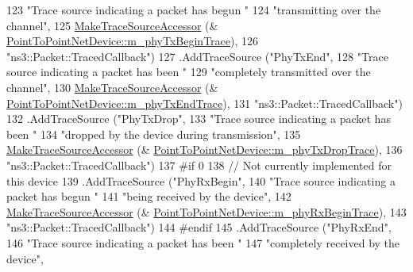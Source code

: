\begin{DoxyCode}
123                      \textcolor{stringliteral}{"Trace source indicating a packet has begun "}
124                      \textcolor{stringliteral}{"transmitting over the channel"},
125                      \hyperlink{group__tracing_gab21a770b9855af4e8f69f7531ea4a6b0}{MakeTraceSourceAccessor} (&
      \hyperlink{classns3_1_1PointToPointNetDevice_aa75567144b7715713970bb575ebd26cf}{PointToPointNetDevice::m\_phyTxBeginTrace}),
126                      \textcolor{stringliteral}{"ns3::Packet::TracedCallback"})
127     .AddTraceSource (\textcolor{stringliteral}{"PhyTxEnd"}, 
128                      \textcolor{stringliteral}{"Trace source indicating a packet has been "}
129                      \textcolor{stringliteral}{"completely transmitted over the channel"},
130                      \hyperlink{group__tracing_gab21a770b9855af4e8f69f7531ea4a6b0}{MakeTraceSourceAccessor} (&
      \hyperlink{classns3_1_1PointToPointNetDevice_ad24afff2bade80cd2e2b952117f3945a}{PointToPointNetDevice::m\_phyTxEndTrace}),
131                      \textcolor{stringliteral}{"ns3::Packet::TracedCallback"})
132     .AddTraceSource (\textcolor{stringliteral}{"PhyTxDrop"}, 
133                      \textcolor{stringliteral}{"Trace source indicating a packet has been "}
134                      \textcolor{stringliteral}{"dropped by the device during transmission"},
135                      \hyperlink{group__tracing_gab21a770b9855af4e8f69f7531ea4a6b0}{MakeTraceSourceAccessor} (&
      \hyperlink{classns3_1_1PointToPointNetDevice_a66a13667106d35d2cbf70c166617c660}{PointToPointNetDevice::m\_phyTxDropTrace}),
136                      \textcolor{stringliteral}{"ns3::Packet::TracedCallback"})
137 \textcolor{preprocessor}{#if 0}
138     \textcolor{comment}{// Not currently implemented for this device}
139     .AddTraceSource (\textcolor{stringliteral}{"PhyRxBegin"}, 
140                      \textcolor{stringliteral}{"Trace source indicating a packet has begun "}
141                      \textcolor{stringliteral}{"being received by the device"},
142                      \hyperlink{group__tracing_gab21a770b9855af4e8f69f7531ea4a6b0}{MakeTraceSourceAccessor} (&
      \hyperlink{classns3_1_1PointToPointNetDevice_aca46a6ee3f8778f9cf13ddd55efc59fa}{PointToPointNetDevice::m\_phyRxBeginTrace}),
143                      \textcolor{stringliteral}{"ns3::Packet::TracedCallback"})
144 \textcolor{preprocessor}{#endif}
145     .AddTraceSource (\textcolor{stringliteral}{"PhyRxEnd"}, 
146                      \textcolor{stringliteral}{"Trace source indicating a packet has been "}
147                      \textcolor{stringliteral}{"completely received by the device"},

\end{DoxyCode}
